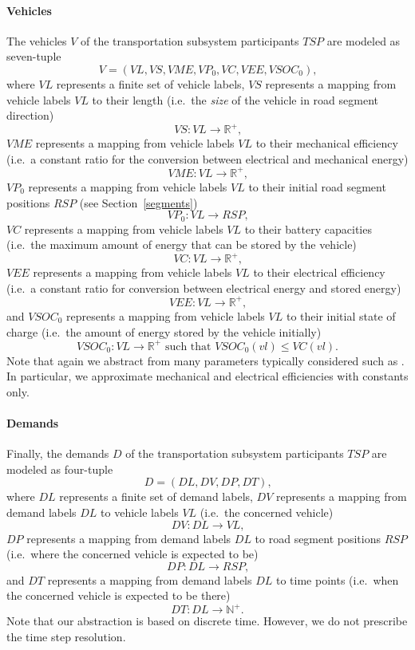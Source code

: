 \paragraph{Vehicles}
\label{vehicles}

The vehicles $V$ of the transportation subsystem participants $TSP$ are modeled as seven-tuple
\[
	V = (VL, VS, VME, VP_0, VC, VEE, VSOC_0) \textrm{,}
\]
where $VL$ represents a finite set of vehicle labels, $VS$ represents a mapping from vehicle labels $VL$ to their length (i.e.\ the \textit{size} of the vehicle in road segment direction)
\[
	VS : VL \rightarrow \mathbb{R}^+ \textrm{,}
\]
$VME$ represents a mapping from vehicle labels $VL$ to their mechanical efficiency (i.e.\ a constant ratio for the conversion between electrical and mechanical energy)
\[
	VME : VL \rightarrow \mathbb{R}^+ \textrm{,}
\]
$VP_0$ represents a mapping from vehicle labels $VL$ to their initial road segment positions $RSP$ (see Section~\ref{segments})
\[
	VP_0 : VL \rightarrow RSP \textrm{,}
\]
$VC$ represents a mapping from vehicle labels $VL$ to their battery capacities (i.e.\ the maximum amount of energy that can be stored by the vehicle)
\[
	VC : VL \rightarrow \mathbb{R}^+ \textrm{,}
\]
$VEE$ represents a mapping from vehicle labels $VL$ to their electrical efficiency (i.e.\ a constant ratio for conversion between electrical energy and stored energy)
\[
	VEE : VL \rightarrow \mathbb{R}^+ \textrm{,}
\]
and $VSOC_0$ represents a mapping from vehicle labels $VL$ to their initial state of charge (i.e.\ the amount of energy stored by the vehicle initially)
\[
	VSOC_0 : VL \rightarrow \mathbb{R}^+ \textrm{ such that } VSOC_0(vl) \leq VC(vl) \textrm{.}
\]
Note that again we abstract from many parameters typically considered such as . In particular, we approximate mechanical and electrical efficiencies with constants only.


\paragraph{Demands}
\label{demands}

Finally, the demands $D$ of the transportation subsystem participants $TSP$ are modeled as four-tuple
\[
	D = (DL, DV, DP, DT) \textrm{,}
\]
where $DL$ represents a finite set of demand labels, $DV$ represents a mapping from demand labels $DL$ to vehicle labels $VL$ (i.e.\ the concerned vehicle)
\[
	DV: DL \rightarrow VL \textrm{,}
\]
$DP$ represents a mapping from demand labels $DL$ to road segment positions $RSP$ (i.e.\ where the concerned vehicle is expected to be)
\[
	DP: DL \rightarrow RSP \textrm{,}
\]
and $DT$ represents a mapping from demand labels $DL$ to time points (i.e.\ when the concerned vehicle is expected to be there)
\[
	DT: DL \rightarrow \mathbb{N}^+ \textrm{.}
\]
Note that our abstraction is based on discrete time. However, we do not prescribe the time step resolution.

